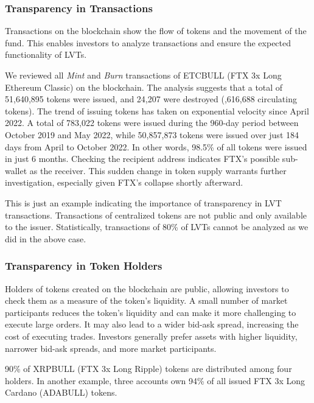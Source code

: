\subsubsection{Transparency in Transactions}
Transactions on the blockchain show the flow of tokens and the movement of the fund. This enables investors to analyze transactions and ensure the expected functionality of LVTs.

\begin{example}
	We reviewed all \textsl{Mint} and \textsl{Burn} transactions of ETCBULL (FTX 3x Long Ethereum Classic) on the blockchain. The analysis suggests that a total of 51,640,895 tokens were issued, and 24,207 were destroyed (,616,688 circulating tokens). The trend of issuing tokens has taken on exponential velocity since April 2022. A total of 783,022 tokens were issued during the 960-day period between October 2019 and May 2022, while 50,857,873 tokens were issued over just 184 days from April to October 2022. In other words, 98.5\% of all tokens were issued in just 6 months. Checking the recipient address indicates FTX's possible sub-wallet as the receiver. This sudden change in token supply warrants further investigation, especially given FTX's collapse shortly afterward.
\end{example}

This is just an example indicating the importance of transparency in LVT transactions. Transactions of centralized tokens are not public and only available to the issuer. Statistically, transactions of 80\% of LVTs cannot be analyzed as we did in the above case.

\subsubsection{Transparency in Token Holders}
Holders of tokens created on the blockchain are public, allowing investors to check them as a measure of the token's liquidity. A small number of market participants reduces the token's liquidity and can make it more challenging to execute large orders. It may also lead to a wider bid-ask spread, increasing the cost of executing trades. Investors generally prefer assets with higher liquidity, narrower bid-ask spreads, and more market participants.
\begin{example}
	90\% of XRPBULL (FTX 3x Long Ripple) tokens are distributed among four holders. In another example, three accounts own 94\% of all issued FTX 3x Long Cardano (ADABULL) tokens.
\end{example}

